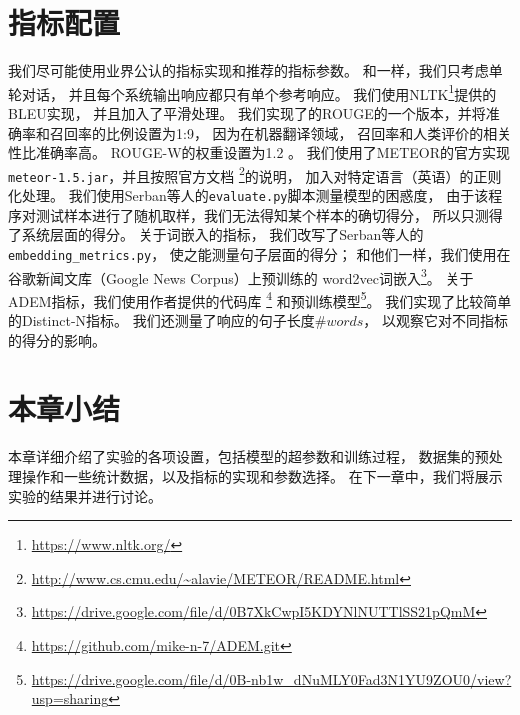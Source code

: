 \section{指标配置}\label{sec:metric_config}
我们尽可能使用业界公认的指标实现和推荐的指标参数。
和一样，我们只考虑单轮对话，
并且每个系统输出响应都只有单个参考响应。
我们使用NLTK\footnote{\url{https://www.nltk.org/}}提供的BLEU实现，
并且加入了平滑处理。
我们实现了的ROUGE的一个版本，并将准确率和召回率的比例设置为1:9，
因为在机器翻译领域，
召回率和人类评价的相关性比准确率高。
ROUGE-W的权重设置为1.2 。
我们使用了METEOR的官方实现\texttt{meteor-1.5.jar}，并且按照官方文档
\footnote{\url{http://www.cs.cmu.edu/~alavie/METEOR/README.html}}的说明，
加入对特定语言（英语）的正则化处理。
我们使用Serban等人的\texttt{evaluate.py}脚本测量模型的困惑度，
由于该程序对测试样本进行了随机取样，我们无法得知某个样本的确切得分，
所以只测得了系统层面的得分。
关于词嵌入的指标，
我们改写了Serban等人的\texttt{embedding\_metrics.py}，
使之能测量句子层面的得分；
和他们一样，我们使用在谷歌新闻文库（Google News Corpus）上预训练的
word2vec词嵌入\footnote{\url{https://drive.google.com/file/d/0B7XkCwpI5KDYNlNUTTlSS21pQmM}}。
关于ADEM指标，我们使用作者提供的代码库
\footnote{\url{https://github.com/mike-n-7/ADEM.git}}
和预训练模型\footnote{\url{https://drive.google.com/file/d/0B-nb1w_dNuMLY0Fad3N1YU9ZOU0/view?usp=sharing}}。
我们实现了比较简单的Distinct-N指标。
我们还测量了响应的句子长度$\textit{\#words}$，
以观察它对不同指标的得分的影响。

\section{本章小结}\label{sec:method_conclusion}
本章详细介绍了实验的各项设置，包括模型的超参数和训练过程，
数据集的预处理操作和一些统计数据，以及指标的实现和参数选择。
在下一章中，我们将展示实验的结果并进行讨论。
